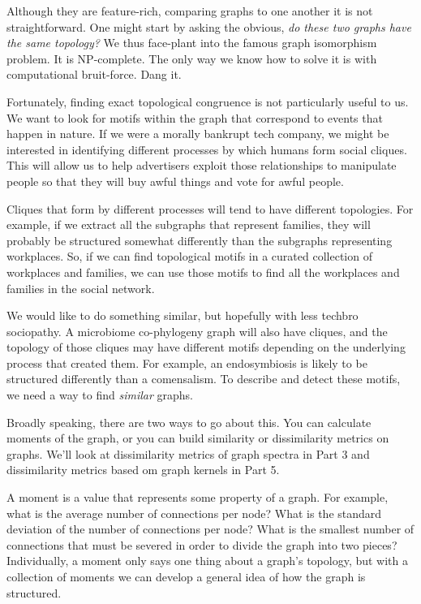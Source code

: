\documentclass[
10pt, %
a4paper, %
oneside, %
headinclude,footinclude, %
BCOR5mm, %
]{scrartcl}
\begin{document}
Although they are feature-rich, comparing graphs to one another it is not straightforward. One might start by asking the obvious, {\em do these two graphs have the same topology?} We thus face-plant into the famous graph isomorphism problem. It is NP-complete. The only way we know how to solve it is with computational bruit-force. Dang it.

Fortunately, finding exact topological congruence is not particularly useful to us. We want to look for motifs within the graph that correspond to events that happen in nature. If we were a morally bankrupt tech company, we might be interested in identifying different processes by which humans form social cliques. This will allow us to help advertisers exploit those relationships to manipulate people so that they will buy awful things and vote for awful people.

Cliques that form by different processes will tend to have different topologies. For example, if we extract all the subgraphs that represent families, they will probably be structured somewhat differently than the subgraphs representing workplaces. So, if we can find topological motifs in a curated collection of workplaces and families, we can use those motifs to find all the workplaces and families in the social network.

We would like to do something similar, but hopefully with less techbro sociopathy. A microbiome co-phylogeny graph will also have cliques, and the topology of those cliques may have different motifs depending on the underlying process that created them. For example, an endosymbiosis is likely to be structured differently than a comensalism. To describe and detect these motifs, we need a way to find {\em similar} graphs.

Broadly speaking, there are two ways to go about this. You can calculate moments of the graph, or you can build similarity or dissimilarity metrics on graphs. We'll look at dissimilarity metrics of graph spectra in Part 3 and dissimilarity metrics based om graph kernels in Part 5. 

A moment is a value that represents some property of a graph. For example, what is the average number of connections per node? What is the standard deviation of the number of connections per node? What is the smallest number of connections that must be severed in order to divide the graph into two pieces? Individually, a moment only says one thing about a graph's topology, but with a collection of moments we can develop a general idea of how the graph is structured.
\end{document}
